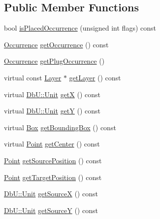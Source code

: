 \subsection*{Public Member Functions}
\begin{DoxyCompactItemize}
\item 
bool \hyperlink{classHurricane_1_1RoutingPad_adc22f158128504ecaaed53cb7b64f194}{is\-Placed\-Occurrence} (unsigned int flags) const 
\item 
\hyperlink{classHurricane_1_1Occurrence}{Occurrence} \hyperlink{classHurricane_1_1RoutingPad_a754f24ce3fee93074dc885bf5a3abb0c}{get\-Occurrence} () const 
\item 
\hyperlink{classHurricane_1_1Occurrence}{Occurrence} \hyperlink{classHurricane_1_1RoutingPad_a30190c50577ce47727dec11f5423a85b}{get\-Plug\-Occurrence} ()
\item 
virtual const \hyperlink{classHurricane_1_1Layer}{Layer} $\ast$ \hyperlink{classHurricane_1_1RoutingPad_ab4b8d96592ee98a7a382c8ad9bf04d24}{get\-Layer} () const 
\item 
virtual \hyperlink{group__DbUGroup_ga4fbfa3e8c89347af76c9628ea06c4146}{Db\-U\-::\-Unit} \hyperlink{classHurricane_1_1RoutingPad_a0b9da07d89fbf4d31ab4bb1efee59572}{get\-X} () const 
\item 
virtual \hyperlink{group__DbUGroup_ga4fbfa3e8c89347af76c9628ea06c4146}{Db\-U\-::\-Unit} \hyperlink{classHurricane_1_1RoutingPad_a77ad7a6251e065a5e2a5e0e0b530e56a}{get\-Y} () const 
\item 
virtual \hyperlink{classHurricane_1_1Box}{Box} \hyperlink{classHurricane_1_1RoutingPad_a996f41b8d6a00263097342639002e3e5}{get\-Bounding\-Box} () const 
\item 
virtual \hyperlink{classHurricane_1_1Point}{Point} \hyperlink{classHurricane_1_1RoutingPad_a647ea8f5e2dbe99aa3c7f4d86ed9afee}{get\-Center} () const 
\item 
\hyperlink{classHurricane_1_1Point}{Point} \hyperlink{classHurricane_1_1RoutingPad_af709637098340a7e9e8df2e2c29d654b}{get\-Source\-Position} () const 
\item 
\hyperlink{classHurricane_1_1Point}{Point} \hyperlink{classHurricane_1_1RoutingPad_a3f4ae4dcb553b35150e581d6775da635}{get\-Target\-Position} () const 
\item 
\hyperlink{group__DbUGroup_ga4fbfa3e8c89347af76c9628ea06c4146}{Db\-U\-::\-Unit} \hyperlink{classHurricane_1_1RoutingPad_af6b2ed32216b056a6dca70cb21be2c9d}{get\-Source\-X} () const 
\item 
\hyperlink{group__DbUGroup_ga4fbfa3e8c89347af76c9628ea06c4146}{Db\-U\-::\-Unit} \hyperlink{classHurricane_1_1RoutingPad_a5765ba71e1bc50257575ee2fedcaffa8}{get\-Source\-Y} () const 

\end{DoxyCompactItemize}
